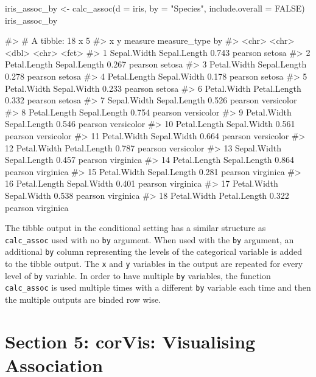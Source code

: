 \begin{Schunk}
\begin{Sinput}
iris_assoc_by <- calc_assoc(d = iris,
                            by = "Species",
                            include.overall = FALSE)
iris_assoc_by
\end{Sinput}
\begin{Soutput}
#> # A tibble: 18 x 5
#>    x            y            measure measure_type by        
#>    <chr>        <chr>          <dbl> <chr>        <fct>     
#>  1 Sepal.Width  Sepal.Length   0.743 pearson      setosa    
#>  2 Petal.Length Sepal.Length   0.267 pearson      setosa    
#>  3 Petal.Width  Sepal.Length   0.278 pearson      setosa    
#>  4 Petal.Length Sepal.Width    0.178 pearson      setosa    
#>  5 Petal.Width  Sepal.Width    0.233 pearson      setosa    
#>  6 Petal.Width  Petal.Length   0.332 pearson      setosa    
#>  7 Sepal.Width  Sepal.Length   0.526 pearson      versicolor
#>  8 Petal.Length Sepal.Length   0.754 pearson      versicolor
#>  9 Petal.Width  Sepal.Length   0.546 pearson      versicolor
#> 10 Petal.Length Sepal.Width    0.561 pearson      versicolor
#> 11 Petal.Width  Sepal.Width    0.664 pearson      versicolor
#> 12 Petal.Width  Petal.Length   0.787 pearson      versicolor
#> 13 Sepal.Width  Sepal.Length   0.457 pearson      virginica 
#> 14 Petal.Length Sepal.Length   0.864 pearson      virginica 
#> 15 Petal.Width  Sepal.Length   0.281 pearson      virginica 
#> 16 Petal.Length Sepal.Width    0.401 pearson      virginica 
#> 17 Petal.Width  Sepal.Width    0.538 pearson      virginica 
#> 18 Petal.Width  Petal.Length   0.322 pearson      virginica
\end{Soutput}
\end{Schunk}

The tibble output in the conditional setting has a similar structure as
\texttt{calc\_assoc} used with no \texttt{by} argument. When used with
the \texttt{by} argument, an additional \texttt{by} column representing
the levels of the categorical variable is added to the tibble output.
The \texttt{x} and \texttt{y} variables in the output are repeated for
every level of \texttt{by} variable. In order to have multiple
\texttt{by} variables, the function \texttt{calc\_assoc} is used
multiple times with a different \texttt{by} variable each time and then
the multiple outputs are binded row wise.

\hypertarget{section-5-corvis-visualising-association}{%
\section{Section 5: corVis: Visualising
Association}\label{section-5-corvis-visualising-association}}


